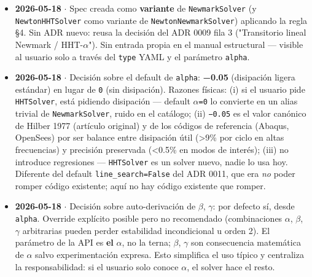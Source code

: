 \documentclass[11pt,letterpaper,oneside]{report}
\begin{document}
\begin{itemize}
  \item \textbf{2026-05-18} \ensuremath{\cdot} Spec creada como \textbf{variante} de \texttt{NewmarkSolver} (y \texttt{NewtonHHTSolver} como variante de \texttt{NewtonNewmarkSolver}) aplicando la regla §4. Sin ADR nuevo: reusa la decisión del ADR 0009 fila 3 ("Transitorio lineal Newmark / HHT-\ensuremath{\alpha}"). Sin entrada propia en el manual estructural --- visible al usuario solo a través del \texttt{type} YAML y el parámetro \texttt{alpha}.
\end{itemize}

\begin{itemize}
  \item \textbf{2026-05-18} \ensuremath{\cdot} Decisión sobre el default de \texttt{alpha}: \textbf{−0.05} (disipación ligera estándar) en lugar de \texttt{0} (sin disipación). Razones físicas: (i) si el usuario pide \texttt{HHTSolver}, está pidiendo disipación --- default \texttt{\ensuremath{\alpha}=0} lo convierte en un alias trivial de \texttt{NewmarkSolver}, ruido en el catálogo; (ii) \texttt{−0.05} es el valor canónico de Hilber 1977 (artículo original) y de los códigos de referencia (Abaqus, OpenSees) por ser balance entre disipación útil (>9\% por ciclo en altas frecuencias) y precisión preservada (<0.5\% en modos de interés); (iii) no introduce regresiones --- \texttt{HHTSolver} es un solver nuevo, nadie lo usa hoy. Diferente del default \texttt{line\_search=False} del ADR 0011, que era \textit{no} poder romper código existente; aquí no hay código existente que romper.
\end{itemize}

\begin{itemize}
  \item \textbf{2026-05-18} \ensuremath{\cdot} Decisión sobre auto-derivación de \ensuremath{\beta}, \ensuremath{\gamma}: por defecto sí, desde \texttt{alpha}. Override explícito posible pero no recomendado (combinaciones \ensuremath{\alpha}, \ensuremath{\beta}, \ensuremath{\gamma} arbitrarias pueden perder estabilidad incondicional u orden 2). El parámetro de la API es \textbf{el} \ensuremath{\alpha}, no la terna; \ensuremath{\beta}, \ensuremath{\gamma} son consecuencia matemática de \ensuremath{\alpha} salvo experimentación expresa. Esto simplifica el uso típico y centraliza la responsabilidad: si el usuario solo conoce \ensuremath{\alpha}, el solver hace el resto.
\end{itemize}


\newpage
\end{document}
